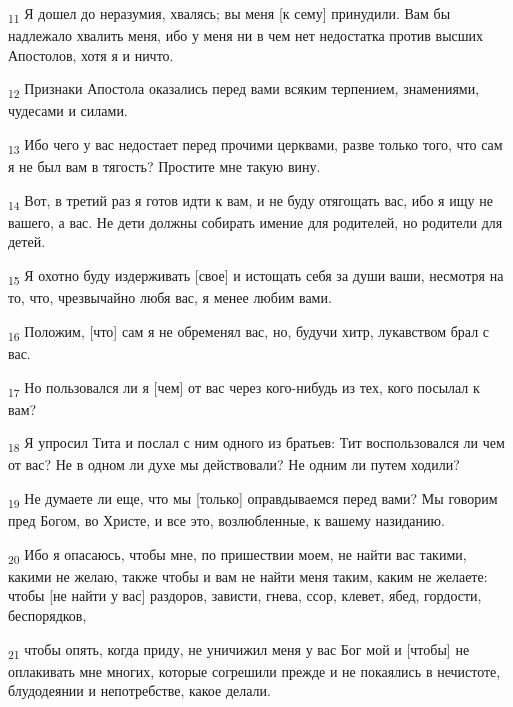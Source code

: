 \begin{tcolorbox}
\textsubscript{11} Я дошел до неразумия, хвалясь; вы меня [к сему] принудили. Вам бы надлежало хвалить меня, ибо у меня ни в чем нет недостатка против высших Апостолов, хотя я и ничто.
\end{tcolorbox}
\begin{tcolorbox}
\textsubscript{12} Признаки Апостола оказались перед вами всяким терпением, знамениями, чудесами и силами.
\end{tcolorbox}
\begin{tcolorbox}
\textsubscript{13} Ибо чего у вас недостает перед прочими церквами, разве только того, что сам я не был вам в тягость? Простите мне такую вину.
\end{tcolorbox}
\begin{tcolorbox}
\textsubscript{14} Вот, в третий раз я готов идти к вам, и не буду отягощать вас, ибо я ищу не вашего, а вас. Не дети должны собирать имение для родителей, но родители для детей.
\end{tcolorbox}
\begin{tcolorbox}
\textsubscript{15} Я охотно буду издерживать [свое] и истощать себя за души ваши, несмотря на то, что, чрезвычайно любя вас, я менее любим вами.
\end{tcolorbox}
\begin{tcolorbox}
\textsubscript{16} Положим, [что] сам я не обременял вас, но, будучи хитр, лукавством брал с вас.
\end{tcolorbox}
\begin{tcolorbox}
\textsubscript{17} Но пользовался ли я [чем] от вас через кого-нибудь из тех, кого посылал к вам?
\end{tcolorbox}
\begin{tcolorbox}
\textsubscript{18} Я упросил Тита и послал с ним одного из братьев: Тит воспользовался ли чем от вас? Не в одном ли духе мы действовали? Не одним ли путем ходили?
\end{tcolorbox}
\begin{tcolorbox}
\textsubscript{19} Не думаете ли еще, что мы [только] оправдываемся перед вами? Мы говорим пред Богом, во Христе, и все это, возлюбленные, к вашему назиданию.
\end{tcolorbox}
\begin{tcolorbox}
\textsubscript{20} Ибо я опасаюсь, чтобы мне, по пришествии моем, не найти вас такими, какими не желаю, также чтобы и вам не найти меня таким, каким не желаете: чтобы [не найти у вас] раздоров, зависти, гнева, ссор, клевет, ябед, гордости, беспорядков,
\end{tcolorbox}
\begin{tcolorbox}
\textsubscript{21} чтобы опять, когда приду, не уничижил меня у вас Бог мой и [чтобы] не оплакивать мне многих, которые согрешили прежде и не покаялись в нечистоте, блудодеянии и непотребстве, какое делали.
\end{tcolorbox}
